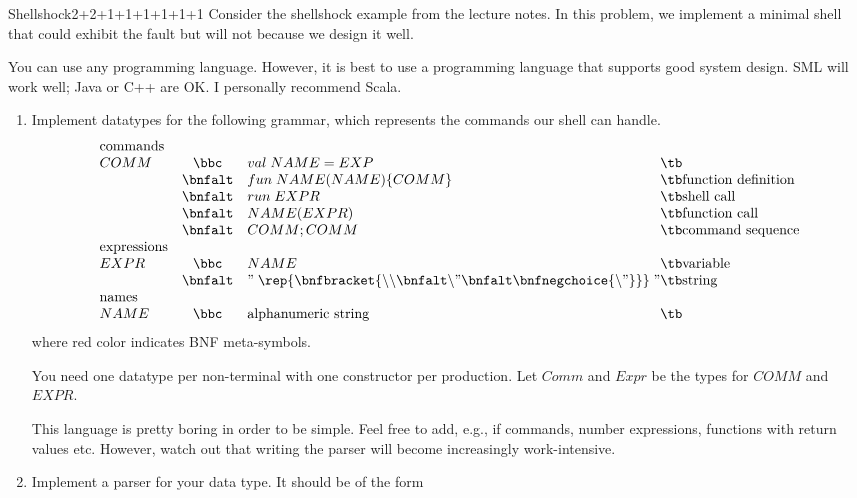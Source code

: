\documentclass[a4paper]{article}
\begin{document}
\header

\begin{problem}{Shellshock}{2+2+1+1+1+1+1+1}
Consider the shellshock example from the lecture notes.
In this problem, we implement a minimal shell that could exhibit the fault but will not because we design it well.

You can use any programming language.
However, it is best to use a programming language that supports good system design.
SML will work well; Java or C++ are OK. I personally recommend Scala.

\renewcommand{\bnf}[1]{{\color{red}#1}}
\begin{enumerate}
\item Implement datatypes for the following grammar, which represents the commands our shell can handle.
\[\begin{array}{lcl@{\tb}l}
 \text{commands} \\
 COMM & \bbc    & val\;NAME=EXP\\
      & \bnfalt & fun\;NAME(NAME) \{COMM\} & \text{function definition} \\
      & \bnfalt & run\;EXPR & \text{shell call}\\
      & \bnfalt & NAME(EXPR) & \text{function call}\\
      & \bnfalt & COMM ; COMM & \text{command sequence}\\
 \text{expressions} \\
 EXPR & \bbc & NAME & \text{variable} \\
      & \bnfalt& "\; \rep{\bnfbracket{\backslash\backslash \bnfalt \backslash" \bnfalt \bnfnegchoice{\backslash"}}} \;" & \text{string} \\
 \text{names} \\
 NAME & \bbc & \text{alphanumeric string} &
\end{array}\]
where red color indicates BNF meta-symbols.

You need one datatype per non-terminal with one constructor per production.
Let $Comm$ and $Expr$ be the types for $COMM$ and $EXPR$.

This language is pretty boring in order to be simple.
Feel free to add, e.g., if commands, number expressions, functions with return values etc.
However, watch out that writing the parser will become increasingly work-intensive.

\item Implement a parser for your data type. It should be of the form
\begin{acode}
\\
\end{acode}


\end{enumerate}
\end{problem}
\end{document}

